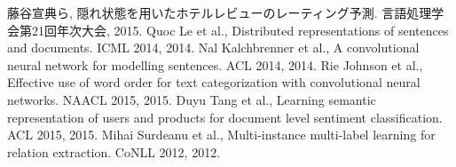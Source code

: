 \documentclass{ttisummary}
\begin{document}
%
%







\begin{thebibliography}{9}
  藤谷宣典ら,
  隠れ状態を用いたホテルレビューのレーティング予測.
  言語処理学会第21回年次大会, 2015.
  Quoc Le et al.,
  Distributed representations of sentences and documents.
  ICML 2014, 2014.
  Nal Kalchbrenner et al.,
  A convolutional neural network for modelling sentences.
  ACL 2014, 2014.
  Rie Johnson et al.,
  Effective use of word order for text categorization
  with convolutional neural networks.
  NAACL 2015, 2015.
  Duyu Tang et al.,
  Learning semantic representation of users and products
  for document level sentiment classification.
  ACL 2015, 2015.
  Mihai Surdeanu et al.,
  Multi-instance multi-label learning for relation extraction.
  CoNLL 2012, 2012.
\end{thebibliography}
\end{document}
